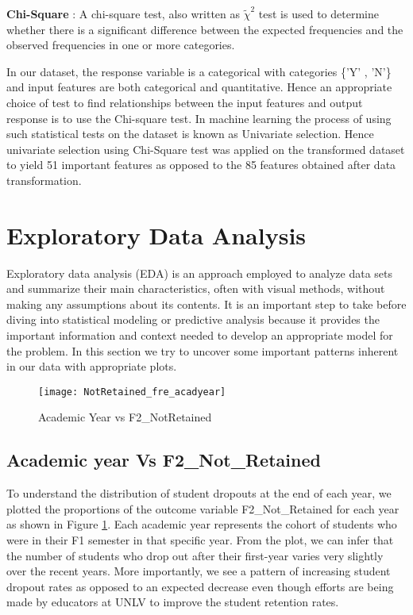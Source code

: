 \documentclass[11pt,openright]{report}
\begin{document}
\noindent \textbf{Chi-Square} : A chi-square test, also written as $\tilde{\chi}^2$ test is used to determine whether there is a significant difference between the expected frequencies and the observed frequencies in one or more categories.

In our dataset, the response variable is a categorical with categories \{'Y' , 'N'\} and input features are both categorical and quantitative. Hence an appropriate choice of test to find relationships between the input features and output response is to use the Chi-square test. In machine learning the process of using such statistical tests on the dataset is known as Univariate selection. Hence univariate selection using Chi-Square test was applied on the transformed dataset to yield 51 important features as opposed to the 85 features obtained after data transformation.





\section{Exploratory Data Analysis}
Exploratory data analysis (EDA) is an approach employed to analyze data sets and summarize their main characteristics, often with visual methods, without making any assumptions about its contents. It is an important step to take before diving into statistical modeling or predictive analysis because it provides the important information and context needed to develop an appropriate model for the problem. In this section we try to uncover some important patterns inherent in our data with appropriate plots.

\begin{figure}
	\centering
	\texttt{[image: NotRetained\_fre\_acadyear]}
	\caption{Academic Year vs F2\_NotRetained}
	\label{fig:AcadYear_F2NotRetained_plot}
\end{figure}


\subsection {Academic year Vs F2\_Not\_Retained}

To understand the distribution of student dropouts at the end of each year, we plotted the proportions of the outcome variable F2\_Not\_Retained for each year as shown in Figure \ref{fig:AcadYear_F2NotRetained_plot}. Each academic year represents the cohort of students who were in their F1 semester in that specific year. From the plot, we can infer that the number of students who drop out after their first-year varies very slightly over the recent years. More importantly, we see a pattern of increasing student dropout rates as opposed to an expected decrease even though efforts are being made by educators at UNLV to improve the student retention rates.
\end{document}
